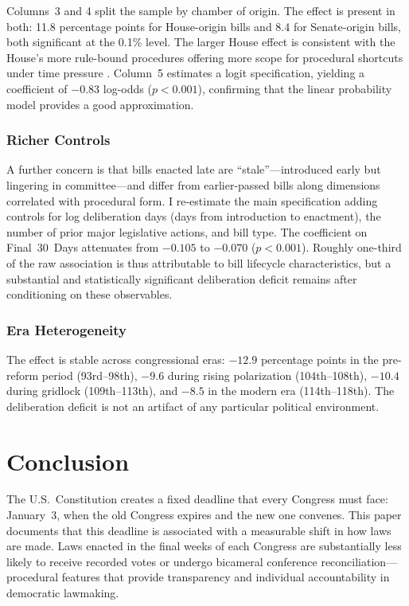 \documentclass[12pt]{article}
\begin{document}
Columns~3 and 4 split the sample by chamber of origin. The effect is present in both: 11.8 percentage points for House-origin bills and 8.4 for Senate-origin bills, both significant at the 0.1\% level. The larger House effect is consistent with the House's more rule-bound procedures offering more scope for procedural shortcuts under time pressure \citep{Oleszek2014}. Column~5 estimates a logit specification, yielding a coefficient of $-0.83$ log-odds ($p < 0.001$), confirming that the linear probability model provides a good approximation.

\subsubsection*{Richer Controls} A further concern is that bills enacted late are ``stale''---introduced early but lingering in committee---and differ from earlier-passed bills along dimensions correlated with procedural form. I re-estimate the main specification adding controls for log deliberation days (days from introduction to enactment), the number of prior major legislative actions, and bill type. The coefficient on Final~30~Days attenuates from $-0.105$ to $-0.070$ ($p < 0.001$). Roughly one-third of the raw association is thus attributable to bill lifecycle characteristics, but a substantial and statistically significant deliberation deficit remains after conditioning on these observables.

\subsubsection*{Era Heterogeneity} The effect is stable across congressional eras: $-12.9$ percentage points in the pre-reform period (93rd--98th), $-9.6$ during rising polarization (104th--108th), $-10.4$ during gridlock (109th--113th), and $-8.5$ in the modern era (114th--118th). The deliberation deficit is not an artifact of any particular political environment.


\section{Conclusion}

The U.S.\ Constitution creates a fixed deadline that every Congress must face: January~3, when the old Congress expires and the new one convenes. This paper documents that this deadline is associated with a measurable shift in how laws are made. Laws enacted in the final weeks of each Congress are substantially less likely to receive recorded votes or undergo bicameral conference reconciliation---procedural features that provide transparency and individual accountability in democratic lawmaking.
\end{document}
